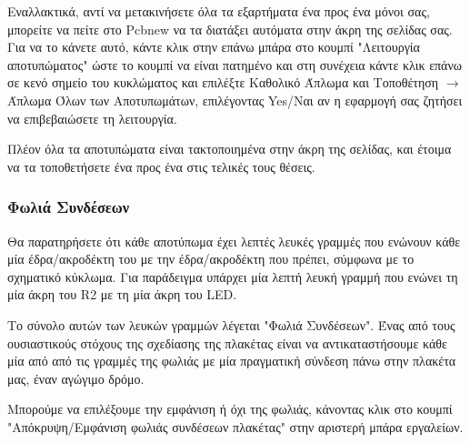 \documentclass[a4paper]{article}
\begin{document}
Εναλλακτικά, αντί να μετακινήσετε όλα τα εξαρτήματα ένα προς ένα μόνοι σας, μπορείτε να πείτε στο \textenglish{Pcbnew} να τα διατάξει αυτόματα στην άκρη της σελίδας σας. Για να το κάνετε αυτό, κάντε κλικ στην επάνω μπάρα στο κουμπί "Λειτουργία αποτυπώματος" ώστε το κουμπί να είναι πατημένο και στη συνέχεια κάντε κλικ επάνω σε κενό σημείο του κυκλώματος και επιλέξτε Καθολικό Άπλωμα και Τοποθέτηση $\rightarrow$ Άπλωμα Όλων των Αποτυπωμάτων, επιλέγοντας Yes/Ναι αν η εφαρμογή σας ζητήσει να επιβεβαιώσετε τη λειτουργία. 

Πλέον όλα τα αποτυπώματα είναι τακτοποιημένα στην άκρη της σελίδας, και έτοιμα να τα τοποθετήσετε ένα προς ένα στις τελικές τους θέσεις.

\begin{figure}
  \begin{center}
    \label{fig:kicad-main}
  \end{center}
\end{figure}

\subsubsection{Φωλιά Συνδέσεων}
Θα παρατηρήσετε ότι κάθε αποτύπωμα έχει λεπτές λευκές γραμμές που ενώνουν κάθε μία έδρα/ακροδέκτη του με την έδρα/ακροδέκτη που πρέπει, σύμφωνα με το σχηματικό κύκλωμα. Για παράδειγμα υπάρχει μία λεπτή λευκή γραμμή που ενώνει τη μία άκρη του R2 με τη μία άκρη του \textenglish{LED}. 

Το σύνολο αυτών των λευκών γραμμών λέγεται "Φωλιά Συνδέσεων". Ένας από τους ουσιαστικούς στόχους της σχεδίασης της πλακέτας είναι να αντικαταστήσουμε κάθε μία από από τις γραμμές της φωλιάς με μία πραγματική σύνδεση πάνω στην πλακέτα μας, έναν αγώγιμο δρόμο. 

Μπορούμε να επιλέξουμε την εμφάνιση ή όχι της φωλιάς, κάνοντας κλικ στο κουμπί "Απόκρυψη/Εμφάνιση φωλιάς συνδέσεων πλακέτας" στην αριστερή μπάρα εργαλείων.

\begin{figure}
  \begin{center}
    \label{fig:kicad-main}
  \end{center}
\end{figure}

\end{document}

